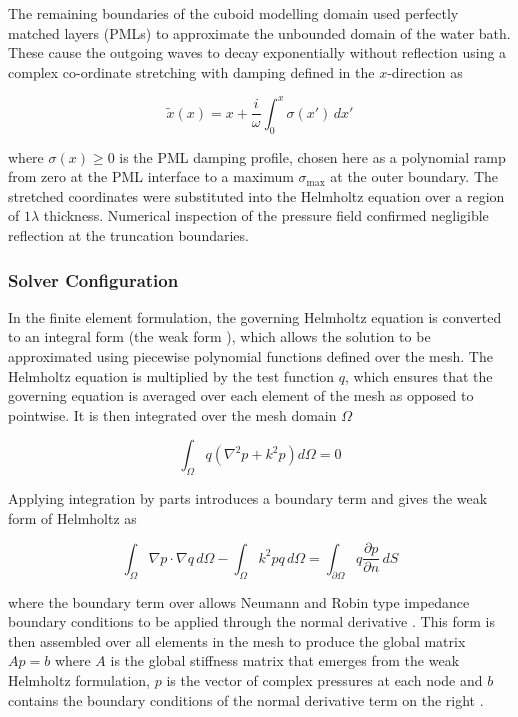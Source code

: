 \documentclass[11pt,a4paper]{article}
\begin{document}
The remaining boundaries of the cuboid modelling domain used perfectly matched layers (PMLs) to approximate the unbounded domain of the water bath. These cause the outgoing waves to decay exponentially without reflection using a complex co-ordinate stretching with damping \cite{berenger1994pml, cimpeanu2015pml, johnson2021pml} defined in the $x$-direction as 

\begin{equation}
\tilde{x}(x) = x + \frac{i}{\omega} \int_0^x \sigma(x')\, dx'
\end{equation}

\noindent where $\sigma(x) \geq 0$ is the PML damping profile, chosen here as a 
polynomial ramp from zero at the PML interface to a maximum $\sigma_{\max}$ 
at the outer boundary. The stretched coordinates were substituted into the Helmholtz equation over a region of $1\lambda$ thickness. Numerical inspection of the pressure
field confirmed negligible reflection at the truncation boundaries.
\\

\subsubsection{Solver Configuration}

In the finite element formulation, the governing Helmholtz equation is converted to an integral form (the weak form \cite{ihlenburg1998finite}), which allows the solution to be approximated using piecewise polynomial functions defined over the mesh. The Helmholtz equation is multiplied by the test function $q$, which ensures that the governing equation is averaged over each element of the mesh as opposed to pointwise. It is then integrated over the mesh domain $\Omega$ \cite{baratta2023dolfinx, logg2012fenics}

\begin{equation}
\int_\Omega q \left( \nabla^2 p + k^2 p \right) d\Omega = 0
\end{equation}

\noindent Applying integration by parts introduces a boundary term and gives the weak form of Helmholtz as \cite{ihlenburg1998finite}

\begin{equation}
\int_\Omega \nabla p \cdot \nabla q \, d\Omega
-
\int_\Omega k^2 p q \, d\Omega
=
\int_{\partial \Omega}
q \frac{\partial p}{\partial n} \, dS
\end{equation}

\noindent where the boundary term over allows Neumann and Robin type impedance boundary conditions to be applied through the normal derivative \cite{ihlenburg1998finite}. This form is then assembled over all elements in the mesh to produce the global matrix $A p = b$ where $A$ is the global stiffness matrix that emerges from the weak Helmholtz formulation, $p$ is the vector of complex pressures at each node and $b$ contains the boundary conditions of the normal derivative term on the right \cite{ihlenburg1998finite}. 
\end{document}
